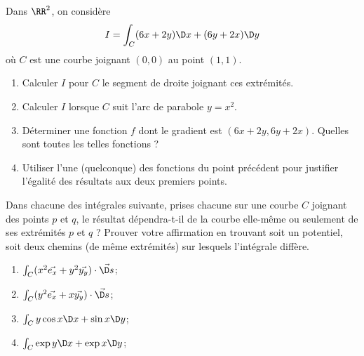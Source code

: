 \documentclass[12pt,french,oneside,a4paper]{memoir} %
\begin{document}
\begin{exo}
Dans $\RR^{2}$, on considère
\begin{equation*}
I = \int_{C} (6x+2y)\D x + (6y +2x)\D y
\end{equation*}
où $C$ est une courbe joignant $(0,0)$ au point $(1,1)$.

\begin{enumerate}
\item Calculer $I$ pour $C$ le segment de droite joignant ces extrémités.
\item Calculer $I$ lorsque $C$ suit l'arc de parabole $y = x^{2}$.
\item Déterminer une fonction $f$ dont le gradient est $(6x+2y,6y+2x)$. Quelles sont toutes les telles fonctions ?
\item Utiliser l'une (quelconque) des fonctions du point précédent pour justifier l'égalité des résultats aux deux premiers points.
\end{enumerate}
\end{exo}

\begin{exo}
Dans chacune des intégrales suivante, prises chacune sur une courbe $C$ joignant des points $p$ et $q$, le résultat dépendra-t-il de la courbe elle-même ou seulement de ses extrémités $p$ et $q$ ? Prouver votre affirmation en trouvant soit un potentiel, soit deux chemins (de même extrémités) sur lesquels l'intégrale diffère.
\begin{enumerate}
\item $\int_{C} (x^{2} \vec{e_{x}} + y^{2} \vec{y_{y}})\cdot \vec{\D s}$;
\item $\int_{C} (y^{2} \vec{e_{x}} + x \vec{y_{y}})\cdot \vec{\D s}$;
\item $\int_{C} y \cos x \D x + \sin x \D y$;
\item $\int_{C} \exp{y} \D x + \exp{x}\D y$;
\end{enumerate}
\end{exo}
\end{document}
